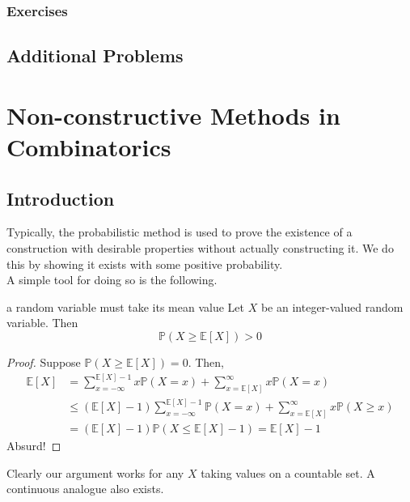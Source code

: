 \documentclass{article}
\newcounter{statementcount}
\begin{document}
\subsubsection*{Exercises}

\newpage

\subsection{Additional Problems}

\newpage

\section{Non-constructive Methods in Combinatorics}

\setcounter{statementcount}{1}

\subsection{Introduction}

Typically, the probabilistic method is used to prove the existence of a construction with desirable properties 
without actually constructing it. We do this by showing it exists with some positive probability.   \\

A simple tool for doing so is the following. 

\begin{lemma}[]{a random variable must take its mean value}
    Let $X$ be an integer-valued random variable. Then \[\mathbb{P}(X \geq \mathbb{E}[X]) > 0\]
\end{lemma}

\begin{proof}
    Suppose $\mathbb{P}(X \geq \mathbb{E}[X]) = 0$. Then, 
    \begin{align*}
        \mathbb{E}[X] &= \sum_{x = - \infty}^{\mathbb{E}[X] - 1}x\mathbb{P}(X = x) + \sum_{x = \mathbb{E}[X]}^\infty 
        x\mathbb{P}(X = x) \\ &\leq (\mathbb{E}[X] - 1)\sum_{x = - \infty}^{\mathbb{E}[X] - 1}\mathbb{P}(X = x) + 
        \sum_{x = \mathbb{E}[X]}^\infty x\mathbb{P}(X \geq x) \\ &= (\mathbb{E}[X] - 1)\mathbb{P}(X \leq \mathbb{E}[X] - 1)
        = \mathbb{E}[X] - 1
    \end{align*}
    Absurd!
\end{proof}

Clearly our argument works for any $X$ taking values on a countable set. A continuous analogue also exists. \\ 
\end{document}
